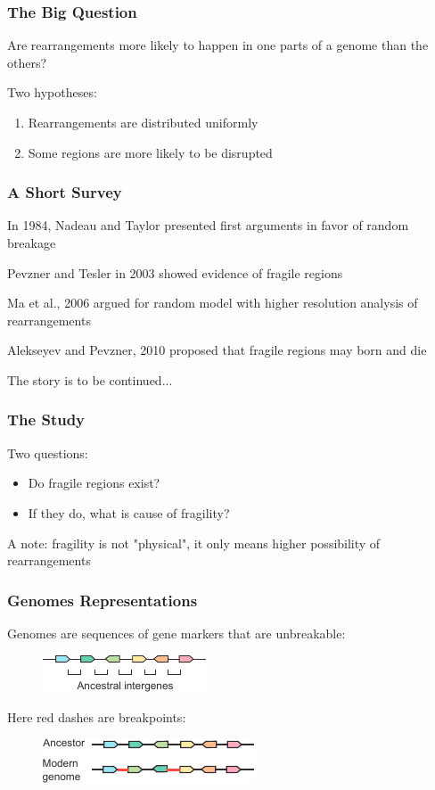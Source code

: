 \documentclass[svgnames,14pt]{beamer}
\begin{document}
\begin{frame}
\frametitle{The Big Question}
Are rearrangements more likely to happen in one parts of a genome than the others?
\pause

\vspace{12pt}
Two hypotheses:
\begin{enumerate}
\item Rearrangements are distributed uniformly
\item Some regions are more likely to be disrupted
\end{enumerate}
\end{frame}

\begin{frame}
\frametitle{A Short Survey}
In 1984, Nadeau and Taylor presented first arguments in favor of random breakage

\pause
\vspace{12pt}
Pevzner and Tesler in 2003 showed evidence of fragile regions

\pause
\vspace{12pt}
Ma et al., 2006 argued for random model with higher resolution analysis of rearrangements 

\pause
\vspace{12pt}
Alekseyev and Pevzner, 2010 proposed that fragile regions may born and die

\pause
\vspace{12pt}
The story is to be continued...
\end{frame}

\begin{frame}
\frametitle{The Study}
Two questions:
\begin{itemize}
\item Do fragile regions exist?
\item If they do, what is cause of fragility?
\end{itemize}

\vspace{12pt}
A note: fragility is not "physical", it only means higher possibility of rearrangements
\end{frame}

\begin{frame}
\frametitle{Genomes Representations}
Genomes are sequences of gene markers that are unbreakable:
\begin{figure}
	\centering
	\includegraphics[scale = 2.20]{Intergenes.pdf}
\end{figure}

\pause
\vspace{12pt}
Here red dashes are breakpoints:
\begin{figure}
	\centering
	\includegraphics[scale = 2.20]{Breakpoint.pdf}
\end{figure}
\end{frame}
\end{document}
